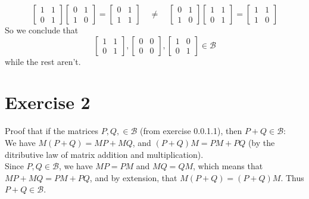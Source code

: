 \documentclass[12pt]{article}
\begin{document}
    \[ \begin{bmatrix}
        1 & 1 \\
        0 & 1
    \end{bmatrix}
    \begin{bmatrix}
        0 & 1 \\
        1 & 0
    \end{bmatrix}
    = \begin{bmatrix}
        0 & 1 \\
        1 & 1
    \end{bmatrix}
    \quad \neq \quad
    \begin{bmatrix}
        0 & 1 \\
        1 & 0
    \end{bmatrix}
    \begin{bmatrix}
        1 & 1 \\
        0 & 1
    \end{bmatrix}
    = \begin{bmatrix}
        1 & 1 \\
        1 & 0
    \end{bmatrix} \]
    So we conclude that
    \[
        \begin{bmatrix}
            1 & 1 \\
            0 & 1
        \end{bmatrix},
        \begin{bmatrix}
            0 & 0 \\
            0 & 0
        \end{bmatrix},
        \begin{bmatrix}
            1 & 0 \\
            0 & 1
        \end{bmatrix}
        \in \mathcal{B}
    \]
    while the rest aren't. \\

    \section*{Exercise 2}
    Proof that if the matrices $P, Q, \in \mathcal{B}$
    (from exercise 0.0.1.1),
    then $P + Q \in \mathcal{B}$: \\
    We have $M(P + Q) = MP + MQ$, and $(P + Q)M = PM + PQ$
    (by the ditributive law of matrix addition and multiplication). \\
    Since $P, Q \in \mathcal{B}$,
    we have $MP = PM$ and $MQ = QM$,
    which means that $MP + MQ = PM + PQ$,
    and by extension, that $M(P + Q) = (P + Q)M$.
    Thus $P + Q \in \mathcal{B}$. \\ 
\end{document}
